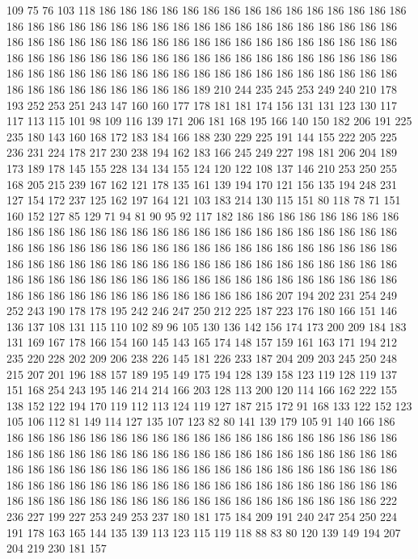 109 75 76 103 118 186 186 186 186 186 186 186 186 186 186 186 186 186 186 186
186 186 186 186 186 186 186 186 186 186 186 186 186 186 186 186 186 186 186 186
186 186 186 186 186 186 186 186 186 186 186 186 186 186 186 186 186 186 186 186
186 186 186 186 186 186 186 186 186 186 186 186 186 186 186 186 186 186 186 186
186 186 186 186 186 186 186 186 186 186 186 186 186 186 186 186 186 186 186 186
186 186 186 186 186 189 210 244 235 245 253 249 240 210 178 193 252 253 251 243
147 160 160 177 178 181 181 174 156 131 131 123 130 117 117 113 115 101 98 109
116 139 171 206 181 168 195 166 140 150 182 206 191 225 235 180 143 160 168 172
183 184 166 188 230 229 225 191 144 155 222 205 225 236 231 224 178 217 230 238
194 162 183 166 245 249 227 198 181 206 204 189 173 189 178 145 155 228 134 134
155 124 120 122 108 137 146 210 253 250 255 168 205 215 239 167 162 121 178 135
161 139 194 170 121 156 135 194 248 231 127 154 172 237 125 162 197 164 121 103
183 214 130 115 151 80 118 78 71 151 160 152 127 85 129 71 94 81 90 95
92 117 182 186 186 186 186 186 186 186 186 186 186 186 186 186 186 186 186 186
186 186 186 186 186 186 186 186 186 186 186 186 186 186 186 186 186 186 186 186
186 186 186 186 186 186 186 186 186 186 186 186 186 186 186 186 186 186 186 186
186 186 186 186 186 186 186 186 186 186 186 186 186 186 186 186 186 186 186 186
186 186 186 186 186 186 186 186 186 186 186 186 186 186 186 186 186 186 186 186
207 194 202 231 254 249 252 243 190 178 178 195 242 246 247 250 212 225 187 223
176 180 166 151 146 136 137 108 131 115 110 102 89 96 105 130 136 142 156 174
173 200 209 184 183 131 169 167 178 166 154 160 145 143 165 174 148 157 159 161
163 171 194 212 235 220 228 202 209 206 238 226 145 181 226 233 187 204 209 203
245 250 248 215 207 201 196 188 157 189 195 149 175 194 128 139 158 123 119 128
119 137 151 168 254 243 195 146 214 214 166 203 128 113 200 120 114 166 162 222
155 138 152 122 194 170 119 112 113 124 119 127 187 215 172 91 168 133 122 152
123 105 106 112 81 149 114 127 135 107 123 82 80 141 139 179 105 91 140 166
186 186 186 186 186 186 186 186 186 186 186 186 186 186 186 186 186 186 186 186
186 186 186 186 186 186 186 186 186 186 186 186 186 186 186 186 186 186 186 186
186 186 186 186 186 186 186 186 186 186 186 186 186 186 186 186 186 186 186 186
186 186 186 186 186 186 186 186 186 186 186 186 186 186 186 186 186 186 186 186
186 186 186 186 186 186 186 186 186 186 186 186 186 186 186 222 236 227 199 227
253 249 253 237 180 181 175 184 209 191 240 247 254 250 224 191 178 163 165 144
135 139 113 123 115 119 118 88 83 80 120 139 149 194 207 204 219 230 181 157

